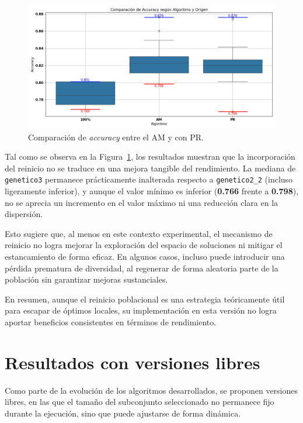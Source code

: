\begin{figure}[htp]
    \centering
    \includegraphics[width=1\textwidth]{imagenes/evaluaciones/reinicio-poblacional}
    \caption{Comparación de \textit{accuracy} entre el AM y con PR.}
    \label{fig:reinicio_poblacional}
\end{figure}

Tal como se observa en la Figura~\ref{fig:reinicio_poblacional}, los resultados muestran que la incorporación del reinicio no se traduce en una mejora tangible del rendimiento.
La mediana de \texttt{genetico3} permanece prácticamente inalterada respecto a \texttt{genetico2\_2} (incluso ligeramente inferior),
y aunque el valor mínimo es inferior (\textbf{0.766} frente a \textbf{0.798}), no se aprecia un incremento en el valor máximo ni una reducción clara en la dispersión.

Esto sugiere que, al menos en este contexto experimental, el mecanismo de reinicio no logra mejorar la exploración del espacio de soluciones
ni mitigar el estancamiento de forma eficaz.
En algunos casos, incluso puede introducir una pérdida prematura de diversidad, al regenerar de forma aleatoria parte de la población sin garantizar mejoras sustanciales.

En resumen, aunque el reinicio poblacional es una estrategia teóricamente útil para escapar de óptimos locales,
su implementación en esta versión no logra aportar beneficios consistentes en términos de rendimiento.

\section{Resultados con versiones libres}\label{sec:resultados-versiones-libres}
Como parte de la evolución de los algoritmos desarrollados, se proponen versiones libres,
en las que el tamaño del subconjunto seleccionado no permanece fijo durante la ejecución, sino que puede ajustarse de forma dinámica.

